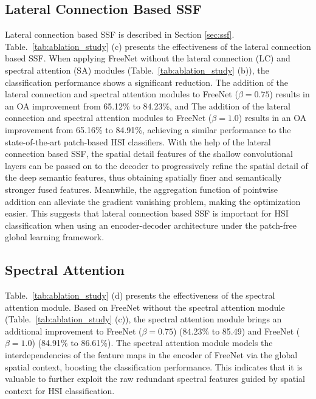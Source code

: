 \documentclass[journal]{IEEEtran}
\begin{document}
\subsection{\textbf{Lateral Connection Based SSF}}
Lateral connection based SSF is described in Section \ref{sec:ssf}.
Table.~\ref{tab:ablation_study} (c) presents the effectiveness of the lateral connection based SSF.
When applying FreeNet without the lateral connection (LC) and spectral attention (SA) modules (Table.~\ref{tab:ablation_study} (b)), the classification performance shows a significant reduction.
The addition of the lateral connection and spectral attention modules to FreeNet ($\beta=0.75$) results in an OA improvement from 65.12\% to 84.23\%, and The addition of the lateral connection and spectral attention modules to FreeNet ($\beta=1.0$) results in an OA improvement from 65.16\% to 84.91\%, achieving a similar performance to the state-of-the-art patch-based HSI classifiers.
With the help of the lateral connection based SSF, the spatial detail features of the shallow convolutional layers can be passed on to the decoder to progressively refine the spatial detail of the deep semantic features, thus obtaining spatially finer and semantically stronger fused features.
Meanwhile, the aggregation function of pointwise addition can alleviate the gradient vanishing problem, making the optimization easier.
This suggests that lateral connection based SSF is important for HSI classification when using an encoder-decoder architecture under the patch-free global learning framework.


\subsection{\textbf{Spectral Attention}}
Table.~\ref{tab:ablation_study} (d) presents the effectiveness of the spectral attention module.
Based on FreeNet without the spectral attention module (Table.~\ref{tab:ablation_study} (c)), the spectral attention module brings an additional improvement to FreeNet ($\beta=0.75$) (84.23\% to 85.49) and FreeNet ($\beta=1.0$) (84.91\% to 86.61\%).
The spectral attention module models the interdependencies of the feature maps in the encoder of FreeNet via the global spatial context, boosting the classification performance.
This indicates that it is valuable to further exploit the raw redundant spectral features guided by spatial context for HSI classification.
\end{document}
